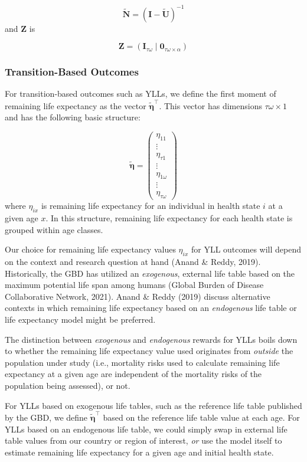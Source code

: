 \documentclass[
]{agujournal2019}
\begin{document}
\[
\tilde{\mathbf{N}}=(\mathbf{I}-\tilde{\mathbf{U}})^{-1}
\] and \(\mathbf{Z}\) is

\[
\mathbf{Z}=\left(\mathbf{I}_{\tau \omega} \mid \mathbf{0}_{\tau \omega \times \alpha}\right)
\]

\subsubsection{Transition-Based
Outcomes}\label{transition-based-outcomes}

For transition-based outcomes such as YLLs, we define the first moment
of remaining life expectancy as the vector
\(\tilde{\boldsymbol{\eta}}^{\top}\). This vector has dimensions
\(\tau\omega \times 1\) and has the following basic structure:

\[
\tilde{\mathbf{\eta}}=\left(\begin{array}{c}
\eta_{11} \\
\vdots \\
\eta_{\tau 1} \\
\hline \vdots \\
\hline \eta_{1 \omega} \\
\vdots \\
\eta_{\tau \omega}
\end{array}\right)
\] where \(\eta_{i x}\) is remaining life expectancy for an individual
in health state \(i\) at a given age \(x\). In this structure, remaining
life expectancy for each health state is grouped within age classes.

Our choice for remaining life expectancy values \(\eta_{i x}\) for YLL
outcomes will depend on the context and research question at hand (Anand
\& Reddy, 2019). Historically, the GBD has utilized an \emph{exogenous},
external life table based on the maximum potential life span among
humans (Global Burden of Disease Collaborative Network, 2021). Anand \&
Reddy (2019) discuss alternative contexts in which remaining life
expectancy based on an \emph{endogenous} life table or life expectancy
model might be preferred.

The distinction between \emph{exogenous} and \emph{endogenous} rewards
for YLLs boils down to whether the remaining life expectancy value used
originates from \emph{outside} the population under study (i.e.,
mortality risks used to calculate remaining life expectancy at a given
age are independent of the mortality risks of the population being
assessed), or not.

For YLLs based on exogenous life tables, such as the reference life
table published by the GBD, we define
\(\tilde{\boldsymbol{\eta}}^{\top}\) based on the reference life table
value at each age. For YLLs based on an endogenous life table, we could
simply swap in external life table values from our country or region of
interest, \emph{or} use the model itself to estimate remaining life
expectancy for a given age and initial health state.
\end{document}
